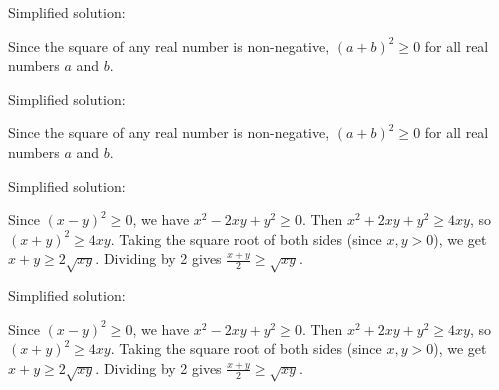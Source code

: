 \documentclass{article}
\begin{document}



Simplified solution:
\begin{tcolorbox}[colback=blue!10, width=\linewidth]
Since the square of any real number is non-negative, $(a+b)^2 \ge 0$ for all real numbers $a$ and $b$.
\end{tcolorbox}



Simplified solution:
\begin{tcolorbox}[colback=blue!10, width=\linewidth]
Since the square of any real number is non-negative, $(a+b)^2 \ge 0$ for all real numbers $a$ and $b$.
\end{tcolorbox}



Simplified solution:
\begin{tcolorbox}[colback=blue!10, width=\linewidth]
Since $(x-y)^2 \ge 0$, we have $x^2 - 2xy + y^2 \ge 0$.  Then $x^2 + 2xy + y^2 \ge 4xy$, so $(x+y)^2 \ge 4xy$. Taking the square root of both sides (since $x, y > 0$), we get $x+y \ge 2\sqrt{xy}$. Dividing by 2 gives $\frac{x+y}{2} \ge \sqrt{xy}$.
\end{tcolorbox}



Simplified solution:
\begin{tcolorbox}[colback=blue!10, width=\linewidth]
Since $(x-y)^2 \ge 0$, we have $x^2 - 2xy + y^2 \ge 0$.  Then $x^2 + 2xy + y^2 \ge 4xy$, so $(x+y)^2 \ge 4xy$. Taking the square root of both sides (since $x, y > 0$), we get $x+y \ge 2\sqrt{xy}$. Dividing by 2 gives $\frac{x+y}{2} \ge \sqrt{xy}$.
\end{tcolorbox}
\end{document}
